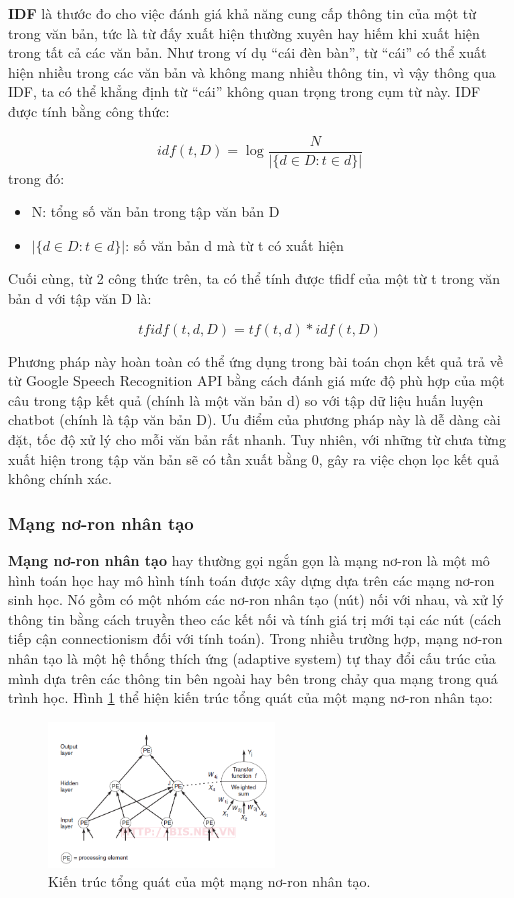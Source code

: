 \documentclass[12pt]{report}
\begin{document}
\textbf{IDF} là thước đo cho việc đánh giá khả năng cung cấp thông tin của một từ trong văn bản, tức là từ đấy xuất hiện thường xuyên hay hiếm khi xuất hiện trong tất cả các văn bản. Như trong ví dụ ``cái đèn bàn'', từ ``cái'' có thể xuất hiện nhiều trong các văn bản và không mang nhiều thông tin, vì vậy thông qua IDF, ta có thể khẳng định từ ``cái'' không quan trọng trong cụm từ này. IDF được tính bằng công thức:

\[idf(t, D) = \log\frac{N}{|\{d \in D: t \in d\}|}\]
trong đó:
\begin{itemize}
	\item N: tổng số văn bản trong tập văn bản D
	\item $|\{d \in D: t \in d\}|$: số văn bản d mà từ t có xuất hiện
\end{itemize}

Cuối cùng, từ 2 công thức trên, ta có thể tính được tfidf của một từ t trong văn bản d với tập văn D là:

\[tfidf(t, d, D) = tf(t, d) * idf(t, D)\]

Phương pháp này hoàn toàn có thể ứng dụng trong bài toán chọn kết quả trả về từ Google Speech Recognition API bằng cách đánh giá mức độ phù hợp của một câu trong tập kết quả (chính là một văn bản d) so với tập dữ liệu huấn luyện chatbot (chính là tập văn bản D). Ưu điểm của phương pháp này là dễ dàng cài đặt, tốc độ xử lý cho mỗi văn bản rất nhanh. Tuy nhiên, với những từ chưa từng xuất hiện trong tập văn bản sẽ có tần xuất bằng 0, gây ra việc chọn lọc kết quả không chính xác.

\subsubsection{Mạng nơ-ron nhân tạo}

\textbf{Mạng nơ-ron nhân tạo} hay thường gọi ngắn gọn là mạng nơ-ron là một mô hình toán học hay mô hình tính toán được xây dựng dựa trên các mạng nơ-ron sinh học. Nó gồm có một nhóm các nơ-ron nhân tạo (nút) nối với nhau, và xử lý thông tin bằng cách truyền theo các kết nối và tính giá trị mới tại các nút (cách tiếp cận connectionism đối với tính toán). Trong nhiều trường hợp, mạng nơ-ron nhân tạo là một hệ thống thích ứng (adaptive system) tự thay đổi cấu trúc của mình dựa trên các thông tin bên ngoài hay bên trong chảy qua mạng trong quá trình học. Hình \ref{fig:ann-model} thể hiện kiến trúc tổng quát của một mạng nơ-ron nhân tạo:

\begin{figure}[H]
	\centering
	\includegraphics[width=6cm]{Pics/Chap5/ann1.png}
	\caption{Kiến trúc tổng quát của một mạng nơ-ron nhân tạo.}
	\label{fig:ann-model}
\end{figure}
\end{document}
